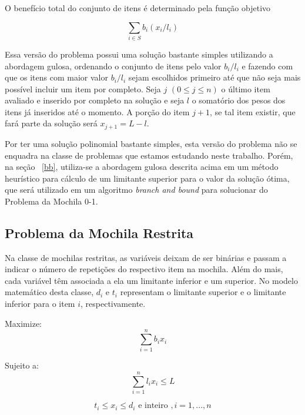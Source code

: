 O benefício total do conjunto de itens é determinado pela função objetivo

\begin{equation}
 \sum_{i \in S} b_i(x_i/l_i)
\end{equation}

Essa versão do problema possui uma solução bastante simples utilizando a abordagem gulosa, ordenando o conjunto de itens pelo valor $b_i/l_i$ e fazendo com que os itens com maior valor $b_i/l_i$ sejam escolhidos primeiro até que não seja mais possível incluir um item por completo. Seja $j$ $(0 \leq j \leq n)$ o último item avaliado e inserido por completo na solução e seja $l$ o somatório dos pesos dos itens já inseridos até o momento.  A porção do item $j+1$, se tal item existir, que fará parte da solução será $x_{j+1} = L-l$. 

Por ter uma solução polinomial bastante simples, esta versão do problema não se enquadra na classe de problemas que estamos estudando neste trabalho. Porém, na seção ~\ref{bb}, utiliza-se a abordagem gulosa descrita acima em um método heurístico para cálculo de um limitante superior para o valor da solução ótima, que será utilizado em um algoritmo {\it branch and bound} para solucionar do Problema da Mochila 0-1. 



\subsection{Problema da Mochila Restrita}

Na classe de mochilas restritas, as variáveis deixam de ser binárias e passam a indicar o número de repetições do respectivo item na mochila. Além do mais, cada variável têm associada a ela um limitante inferior e um superior. No modelo matemático desta classe, $d_i$ e $t_i$ representam o limitante superior e o limitante inferior para o item $i$, respectivamente. 

\hspace*{3.0cm} Maximize:
\begin{equation}
 \sum_{i=1}^n b_i x_i 
\end{equation} 

\hspace*{3.0cm} Sujeito a:
\begin{equation}
 \sum_{i=1}^n l_i x_i  \leq L
\end{equation} 

\begin{equation}
 t_i \leq x_i \leq d_i \textrm{ e inteiro }, i=1,...,n 
\end{equation} 


